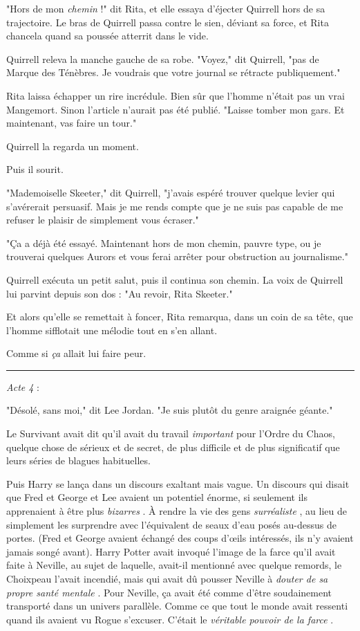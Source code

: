 "Hors de mon \emph{chemin} !" dit Rita, et elle essaya d'éjecter Quirrell hors de sa trajectoire. Le bras de Quirrell passa contre le sien, déviant sa force, et Rita chancela quand sa poussée atterrit dans le vide.

Quirrell releva la manche gauche de sa robe. "Voyez," dit Quirrell, "pas de Marque des Ténèbres. Je voudrais que votre journal se rétracte publiquement."

Rita laissa échapper un rire incrédule. Bien sûr que l'homme n'était pas un vrai Mangemort. Sinon l'article n'aurait pas été publié. "Laisse tomber mon gars. Et maintenant, vas faire un tour."

Quirrell la regarda un moment.

Puis il sourit.

"Mademoiselle Skeeter," dit Quirrell, "j'avais espéré trouver quelque levier qui s'avérerait persuasif. Mais je me rends compte que je ne suis pas capable de me refuser le plaisir de simplement vous écraser."

"Ça a déjà été essayé. Maintenant hors de mon chemin, pauvre type, ou je trouverai quelques Aurors et vous ferai arrêter pour obstruction au journalisme."

Quirrell exécuta un petit salut, puis il continua son chemin. La voix de Quirrell lui parvint depuis son dos : "Au revoir, Rita Skeeter."

Et alors qu'elle se remettait à foncer, Rita remarqua, dans un coin de sa tête, que l'homme sifflotait une mélodie tout en s'en allant.

Comme si \emph{ça} allait lui faire peur.
\par\noindent\rule{\textwidth}{0.4pt}
\emph{Acte 4} :

"Désolé, sans moi," dit Lee Jordan. "Je suis plutôt du genre araignée géante."

Le Survivant avait dit qu'il avait du travail \emph{important} pour l'Ordre du Chaos, quelque chose de sérieux et de secret, de plus difficile et de plus significatif que leurs séries de blagues habituelles.

Puis Harry se lança dans un discours exaltant mais vague. Un discours qui disait que Fred et George et Lee avaient un potentiel énorme, si seulement ils apprenaient à être plus \emph{bizarres} . À rendre la vie des gens \emph{surréaliste} , au lieu de simplement les surprendre avec l'équivalent de seaux d'eau posés au-dessus de portes. (Fred et George avaient échangé des coups d'œils intéressés, ils n'y avaient jamais songé avant). Harry Potter avait invoqué l'image de la farce qu'il avait faite à Neville, au sujet de laquelle, avait-il mentionné avec quelque remords, le Choixpeau l'avait incendié, mais qui avait dû pousser Neville à \emph{douter de sa propre santé mentale} . Pour Neville, ça avait été comme d'être soudainement transporté dans un univers parallèle. Comme ce que tout le monde avait ressenti quand ils avaient vu Rogue s'excuser. C'était le \emph{véritable pouvoir de la farce} .

